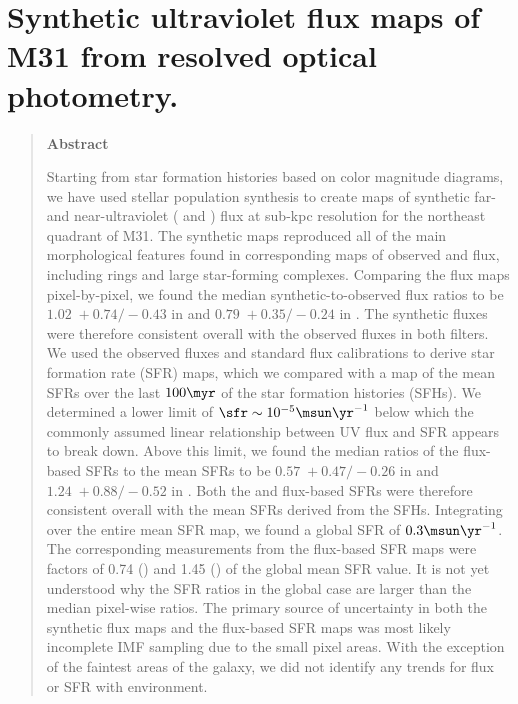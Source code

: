 \chapter{Synthetic ultraviolet flux maps of M31 from resolved optical
    photometry.
}
\label{m31flux}

\begin{quote}
\begin{center}
\textbf{\large Abstract}
\end{center}

Starting from star formation histories based on color magnitude diagrams, we
have used stellar population synthesis to create maps of synthetic far- and
near-ultraviolet (\fuv{} and \nuv{}) flux at sub-kpc resolution for the
northeast quadrant of M31. The synthetic maps reproduced all of the main
morphological features found in corresponding maps of observed \fuv{} and
\nuv{} flux, including rings and large star-forming complexes. Comparing the
flux maps pixel-by-pixel, we found the median synthetic-to-observed flux ratios
to be $1.02 \;+\!0.74/\!-\!0.43$ in \fuv{} and $0.79 \;+\!0.35/\!-\!0.24$ in
\nuv{}. The synthetic fluxes were therefore consistent overall with the
observed fluxes in both filters. We used the observed fluxes and standard flux
calibrations to derive star formation rate (SFR) maps, which we compared with a
map of the mean SFRs over the last $100\myr$ of the star formation histories
(SFHs). We determined a lower limit of $\sfr \sim 10^{-5}\msun\yr^{-1}$ below
which the commonly assumed linear relationship between UV flux and SFR appears
to break down. Above this limit, we found the median ratios of the flux-based
SFRs to the mean SFRs to be $0.57 \;+\!0.47/\!-\!0.26$ in \fuv{} and $1.24
\;+\!0.88/\!-\!0.52$ in \nuv{}. Both the \fuv{} and \nuv{} flux-based SFRs were
therefore consistent overall with the mean SFRs derived from the SFHs.
Integrating over the entire mean SFR map, we found a global SFR of
$0.3\msun\yr^{-1}$. The corresponding measurements from the flux-based SFR maps
were factors of 0.74 (\fuv{}) and 1.45 (\nuv{}) of the global mean SFR value.
It is not yet understood why the SFR ratios in the global case are larger than
the median pixel-wise ratios. The primary source of uncertainty in both the
synthetic flux maps and the flux-based SFR maps was most likely incomplete IMF
sampling due to the small pixel areas. With the exception of the faintest areas
of the galaxy, we did not identify any trends for flux or SFR with environment.

\end{quote}





